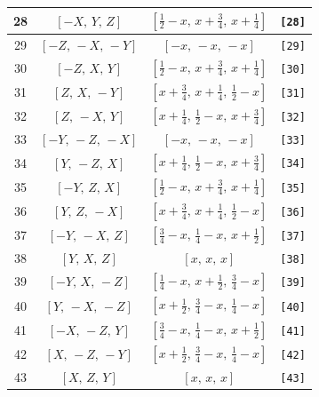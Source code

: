 \documentclass[fleqn,8pt]{jsarticle}
\begin{document}
\begin{longtable}{cccc}
28 & $\left[ - X,\, Y,\, Z \right]$ & $\left[ \frac{1}{2} - x,\, x + \frac{3}{4},\, x + \frac{1}{4} \right]$ & {\tt [28]} \\ \hline
29 & $\left[ - Z,\, - X,\, - Y \right]$ & $\left[ - x,\, - x,\, - x \right]$ & {\tt [29]} \\ \hline
30 & $\left[ - Z,\, X,\, Y \right]$ & $\left[ \frac{1}{2} - x,\, x + \frac{3}{4},\, x + \frac{1}{4} \right]$ & {\tt [30]} \\ \hline
31 & $\left[ Z,\, X,\, - Y \right]$ & $\left[ x + \frac{3}{4},\, x + \frac{1}{4},\, \frac{1}{2} - x \right]$ & {\tt [31]} \\ \hline
32 & $\left[ Z,\, - X,\, Y \right]$ & $\left[ x + \frac{1}{4},\, \frac{1}{2} - x,\, x + \frac{3}{4} \right]$ & {\tt [32]} \\ \hline
33 & $\left[ - Y,\, - Z,\, - X \right]$ & $\left[ - x,\, - x,\, - x \right]$ & {\tt [33]} \\ \hline
34 & $\left[ Y,\, - Z,\, X \right]$ & $\left[ x + \frac{1}{4},\, \frac{1}{2} - x,\, x + \frac{3}{4} \right]$ & {\tt [34]} \\ \hline
35 & $\left[ - Y,\, Z,\, X \right]$ & $\left[ \frac{1}{2} - x,\, x + \frac{3}{4},\, x + \frac{1}{4} \right]$ & {\tt [35]} \\ \hline
36 & $\left[ Y,\, Z,\, - X \right]$ & $\left[ x + \frac{3}{4},\, x + \frac{1}{4},\, \frac{1}{2} - x \right]$ & {\tt [36]} \\ \hline
37 & $\left[ - Y,\, - X,\, Z \right]$ & $\left[ \frac{3}{4} - x,\, \frac{1}{4} - x,\, x + \frac{1}{2} \right]$ & {\tt [37]} \\ \hline
38 & $\left[ Y,\, X,\, Z \right]$ & $\left[ x,\, x,\, x \right]$ & {\tt [38]} \\ \hline
39 & $\left[ - Y,\, X,\, - Z \right]$ & $\left[ \frac{1}{4} - x,\, x + \frac{1}{2},\, \frac{3}{4} - x \right]$ & {\tt [39]} \\ \hline
40 & $\left[ Y,\, - X,\, - Z \right]$ & $\left[ x + \frac{1}{2},\, \frac{3}{4} - x,\, \frac{1}{4} - x \right]$ & {\tt [40]} \\ \hline
41 & $\left[ - X,\, - Z,\, Y \right]$ & $\left[ \frac{3}{4} - x,\, \frac{1}{4} - x,\, x + \frac{1}{2} \right]$ & {\tt [41]} \\ \hline
42 & $\left[ X,\, - Z,\, - Y \right]$ & $\left[ x + \frac{1}{2},\, \frac{3}{4} - x,\, \frac{1}{4} - x \right]$ & {\tt [42]} \\ \hline
43 & $\left[ X,\, Z,\, Y \right]$ & $\left[ x,\, x,\, x \right]$ & {\tt [43]} \\ \hline

\end{longtable}
\end{document}
